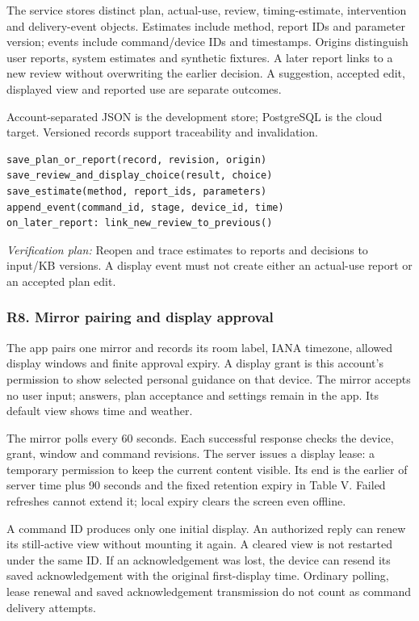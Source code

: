 \documentclass[conference,letterpaper]{IEEEtran}
\begin{document}
The service stores distinct plan, actual-use, review, timing-estimate, intervention and delivery-event objects. Estimates include method, report IDs and parameter version; events include command/device IDs and timestamps. Origins distinguish user reports, system estimates and synthetic fixtures. A later report links to a new review without overwriting the earlier decision. A suggestion, accepted edit, displayed view and reported use are separate outcomes.

Account-separated JSON is the development store; PostgreSQL is the cloud target. Versioned records support traceability and invalidation.

\begin{lstlisting}
save_plan_or_report(record, revision, origin)
save_review_and_display_choice(result, choice)
save_estimate(method, report_ids, parameters)
append_event(command_id, stage, device_id, time)
on_later_report: link_new_review_to_previous()
\end{lstlisting}



\textit{Verification plan:} Reopen and trace estimates to reports and decisions to input/KB versions. A display event must not create either an actual-use report or an accepted plan edit.

\subsubsection*{R8. Mirror pairing and display approval}

The app pairs one mirror and records its room label, IANA timezone, allowed display windows and finite approval expiry. A display grant is this account's permission to show selected personal guidance on that device. The mirror accepts no user input; answers, plan acceptance and settings remain in the app. Its default view shows time and weather.

The mirror polls every 60 seconds. Each successful response checks the device, grant, window and command revisions. The server issues a display lease: a temporary permission to keep the current content visible. Its end is the earlier of server time plus 90 seconds and the fixed retention expiry in Table V. Failed refreshes cannot extend it; local expiry clears the screen even offline.

A command ID produces only one initial display. An authorized reply can renew its still-active view without mounting it again. A cleared view is not restarted under the same ID. If an acknowledgement was lost, the device can resend its saved acknowledgement with the original first-display time. Ordinary polling, lease renewal and saved acknowledgement transmission do not count as command delivery attempts.
\end{document}
